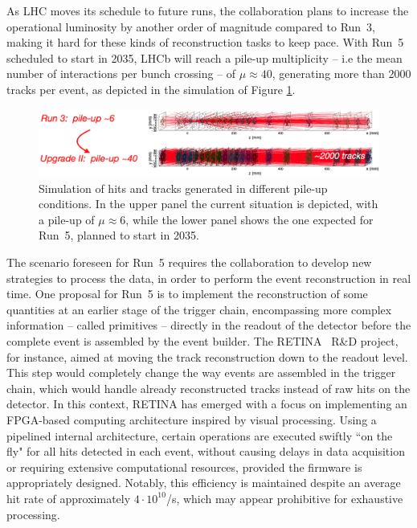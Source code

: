 As LHC moves its schedule to future runs, the collaboration plans to increase the operational luminosity by another order of magnitude compared to Run~3, making it hard for these kinds of reconstruction tasks to keep pace. With Run~5 scheduled to start in 2035, LHCb will reach a pile-up multiplicity -- i.e the mean number of interactions per bunch crossing -- of $\mu\approx 40$, generating more than 2000 tracks per event, as depicted in the simulation of Figure \ref{fig:velo_pile-up}. 

\begin{figure}
    \centering
    \includegraphics[width=\textwidth]{figures/VELO_pile-up.png}
    \caption{Simulation of hits and tracks generated in different pile-up conditions. In the upper panel the current situation is depicted, with a pile-up of $\mu\approx 6$, while the lower panel shows the one expected for Run~5, planned to start in 2035.}
    \label{fig:velo_pile-up}
\end{figure}

The scenario foreseen for Run~5 requires the collaboration to develop new strategies to process the data, in order to perform the event reconstruction in real time. One proposal for Run~5 is to implement the reconstruction of some quantities at an earlier stage of the trigger chain, encompassing  more complex information -- called primitives -- directly in the readout of the detector before the complete event is assembled by the event builder. The RETINA~\cite{refId0} R\&D project, for instance, aimed at moving the track reconstruction down to the readout level. This step would completely change the way events are assembled in the trigger chain, which would handle already reconstructed tracks instead of raw hits on the detector. In this context, RETINA has emerged with a focus on implementing an FPGA-based computing architecture inspired by visual processing. Using a pipelined internal architecture, certain operations are executed swiftly ``on the fly" for all hits detected in each event, without causing delays in data acquisition or requiring extensive computational resources, provided the firmware is appropriately designed. Notably, this efficiency is maintained despite an average hit rate of approximately $4 \cdot 10^{10}$/s, which may appear prohibitive for exhaustive processing.


